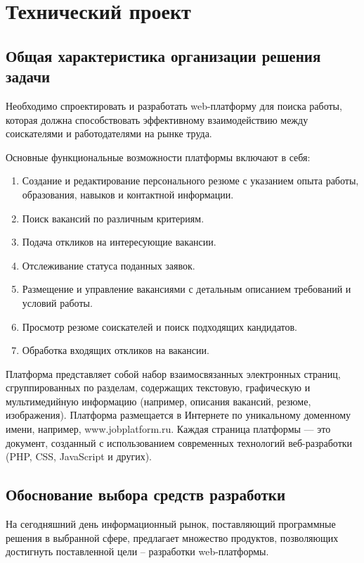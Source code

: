 \section{Технический проект}
\subsection{Общая характеристика организации решения задачи}

Необходимо спроектировать и разработать web-платформу для поиска работы, которая должна способствовать эффективному взаимодействию между соискателями и работодателями на рынке труда.

Основные функциональные возможности платформы включают в себя:
\begin{enumerate}
	\item Создание и редактирование персонального резюме с указанием опыта работы, образования, навыков и контактной информации.
	\item Поиск вакансий по различным критериям.
	\item Подача откликов на интересующие вакансии.
	\item Отслеживание статуса поданных заявок.
	\item Размещение и управление вакансиями с детальным описанием требований и условий работы.
	\item Просмотр резюме соискателей и поиск подходящих кандидатов.
	\item Обработка входящих откликов на вакансии.
\end{enumerate}

Платформа представляет собой набор взаимосвязанных электронных страниц, сгруппированных по разделам, содержащих текстовую, графическую и мультимедийную информацию (например, описания вакансий, резюме, изображения). Платформа размещается в Интернете по уникальному доменному имени, например, www.jobplatform.ru. Каждая страница платформы — это документ, созданный с использованием современных технологий веб-разработки (PHP, CSS, JavaScript и других).

\subsection{Обоснование выбора средств разработки}

На сегодняшний день информационный рынок, поставляющий программные решения в выбранной сфере, предлагает множество продуктов, позволяющих достигнуть поставленной цели – разработки web-платформы.

